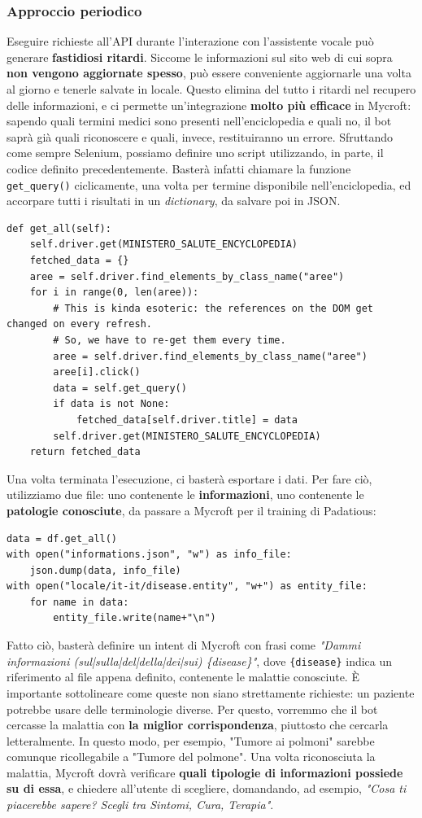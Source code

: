 \subsubsection{Approccio periodico}
Eseguire richieste all'API durante l'interazione con l'assistente vocale può generare \textbf{fastidiosi ritardi}. Siccome le informazioni sul sito web di cui sopra \textbf{non vengono aggiornate spesso}, può essere conveniente aggiornarle una volta al giorno e tenerle salvate in locale. Questo elimina del tutto i ritardi nel recupero delle informazioni, e ci permette un'integrazione \textbf{molto più efficace} in Mycroft: sapendo quali termini medici sono presenti nell'enciclopedia e quali no, il bot saprà già quali riconoscere e quali, invece, restituiranno un errore. Sfruttando come sempre Selenium, possiamo definire uno script utilizzando, in parte, il codice definito precedentemente. Basterà infatti chiamare la funzione \texttt{get\_query()} ciclicamente, una volta per termine disponibile nell'enciclopedia, ed accorpare tutti i risultati in un \textit{dictionary}, da salvare poi in JSON.
\begin{verbatim}
def get_all(self):
    self.driver.get(MINISTERO_SALUTE_ENCYCLOPEDIA)
    fetched_data = {}
    aree = self.driver.find_elements_by_class_name("aree")
    for i in range(0, len(aree)):
        # This is kinda esoteric: the references on the DOM get changed on every refresh. 
        # So, we have to re-get them every time.
        aree = self.driver.find_elements_by_class_name("aree")
        aree[i].click()
        data = self.get_query()
        if data is not None:
            fetched_data[self.driver.title] = data
        self.driver.get(MINISTERO_SALUTE_ENCYCLOPEDIA)
    return fetched_data
\end{verbatim}
Una volta terminata l'esecuzione, ci basterà esportare i dati. Per fare ciò, utilizziamo due file: uno contenente le \textbf{informazioni}, uno contenente le \textbf{patologie conosciute}, da passare a Mycroft per il training di Padatious:
\begin{verbatim}
data = df.get_all()
with open("informations.json", "w") as info_file:
    json.dump(data, info_file)
with open("locale/it-it/disease.entity", "w+") as entity_file:
    for name in data:
        entity_file.write(name+"\n")
\end{verbatim}
Fatto ciò, basterà definire un intent di Mycroft con frasi come \textit{"Dammi informazioni (sul|sulla|del|della|dei|sui) \{disease\}"}, dove \texttt{\{disease\}} indica un riferimento al file appena definito, contenente le malattie conosciute. È importante sottolineare come queste non siano strettamente richieste: un paziente potrebbe usare delle terminologie diverse. Per questo, vorremmo che il bot cercasse la malattia con \textbf{la miglior corrispondenza}, piuttosto che cercarla letteralmente. In questo modo, per esempio, "Tumore ai polmoni" sarebbe comunque ricollegabile a "Tumore del polmone". Una volta riconosciuta la malattia, Mycroft dovrà verificare \textbf{quali tipologie di informazioni possiede su di essa}, e chiedere all'utente di scegliere, domandando, ad esempio, \textit{"Cosa ti piacerebbe sapere? Scegli tra Sintomi, Cura, Terapia"}.
